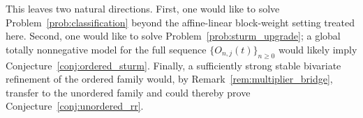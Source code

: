 \documentclass[11pt,reqno]{amsart}
\theoremstyle{definition}
\begin{document}
This leaves two natural directions. First, one would like to solve
Problem~\ref{prob:classification} beyond the affine-linear block-weight setting
treated here. Second, one would like to solve
Problem~\ref{prob:sturm_upgrade}; a global totally nonnegative model for the
full sequence \(\{O_{n,j}(t)\}_{n\geq 0}\) would likely imply
Conjecture~\ref{conj:ordered_sturm}. Finally, a sufficiently strong stable
bivariate refinement of the ordered family would, by
Remark~\ref{rem:multiplier_bridge}, transfer to the unordered family and could
thereby prove Conjecture~\ref{conj:unordered_rr}.



\end{document}

